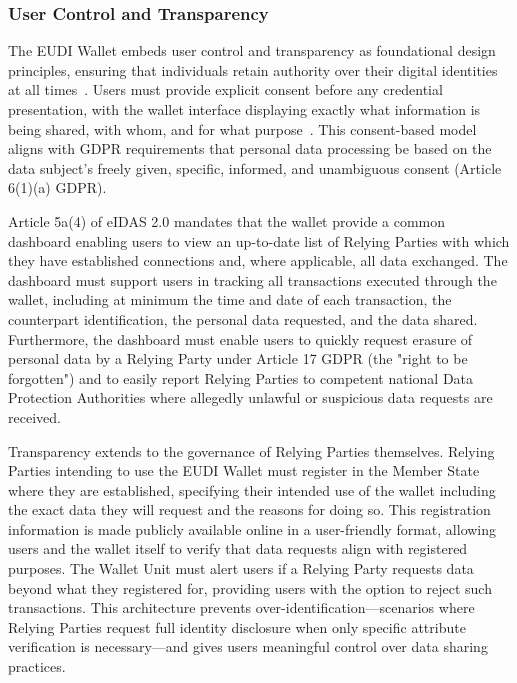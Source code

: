 \documentclass[sigconf,balance,nonacm,authordraft]{acmart}
\begin{document}
\subsubsection{User Control and Transparency}

The EUDI Wallet embeds user control and transparency as foundational design principles, ensuring that individuals retain authority over their digital identities at all times~\cite{ISC2_GuidingPrinciples,Potential_UserCentricity}. Users must provide explicit consent before any credential presentation, with the wallet interface displaying exactly what information is being shared, with whom, and for what purpose~\cite{ISC2_ConsentRole}. This consent-based model aligns with GDPR requirements that personal data processing be based on the data subject's freely given, specific, informed, and unambiguous consent (Article 6(1)(a) GDPR).

Article 5a(4) of eIDAS 2.0 mandates that the wallet provide a common dashboard enabling users to view an up-to-date list of Relying Parties with which they have established connections and, where applicable, all data exchanged. The dashboard must support users in tracking all transactions executed through the wallet, including at minimum the time and date of each transaction, the counterpart identification, the personal data requested, and the data shared. Furthermore, the dashboard must enable users to quickly request erasure of personal data by a Relying Party under Article 17 GDPR (the "right to be forgotten") and to easily report Relying Parties to competent national Data Protection Authorities where allegedly unlawful or suspicious data requests are received.

Transparency extends to the governance of Relying Parties themselves. Relying Parties intending to use the EUDI Wallet must register in the Member State where they are established, specifying their intended use of the wallet including the exact data they will request and the reasons for doing so. This registration information is made publicly available online in a user-friendly format, allowing users and the wallet itself to verify that data requests align with registered purposes. The Wallet Unit must alert users if a Relying Party requests data beyond what they registered for, providing users with the option to reject such transactions. This architecture prevents over-identification—scenarios where Relying Parties request full identity disclosure when only specific attribute verification is necessary—and gives users meaningful control over data sharing practices.
\end{document}

